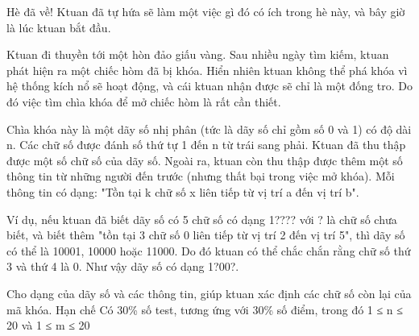 Hè đã về! Ktuan đã tự hứa sẽ làm một việc gì đó có ích trong hè này, và bây giờ là lúc ktuan bắt đầu.

Ktuan đi thuyền tới một hòn đảo giấu vàng. Sau nhiều ngày tìm kiếm, ktuan phát hiện ra một chiếc hòm đã bị khóa. Hiển nhiên ktuan không thể phá khóa vì hệ thống kích nổ sẽ hoạt động, và cái ktuan nhận được sẽ chỉ là một đống tro. Do đó việc tìm chìa khóa để mở chiếc hòm là rất cần thiết.

Chìa khóa này là một dãy số nhị phân (tức là dãy số chỉ gồm số 0 và 1) có độ dài n. Các chữ số được đánh số thứ tự 1 đến n từ trái sang phải. Ktuan đã thu thập được một số chữ số của dãy số. Ngoài ra, ktuan còn thu thập được thêm một số thông tin từ những người đến trước (nhưng thất bại trong việc mở khóa). Mỗi thông tin có dạng: "Tồn tại k chữ số x liên tiếp từ vị trí a đến vị trí b".

Ví dụ, nếu ktuan đã biết dãy số có 5 chữ số có dạng 1???? với ? là chữ số chưa biết, và biết thêm "tồn tại 3 chữ số 0 liên tiếp từ vị trí 2 đến vị trí 5", thì dãy số có thể là 10001, 10000 hoặc 11000. Do đó ktuan có thể chắc chắn rằng chữ số thứ 3 và thứ 4 là 0. Như vậy dãy số có dạng 1?00?.

Cho dạng của dãy số và các thông tin, giúp ktuan xác định các chữ số còn lại của mã khóa.
Hạn chế
Có 30\% số test, tương ứng với 30\% số điểm, trong đó 1 ≤ n ≤ 20 và 1 ≤ m ≤ 20